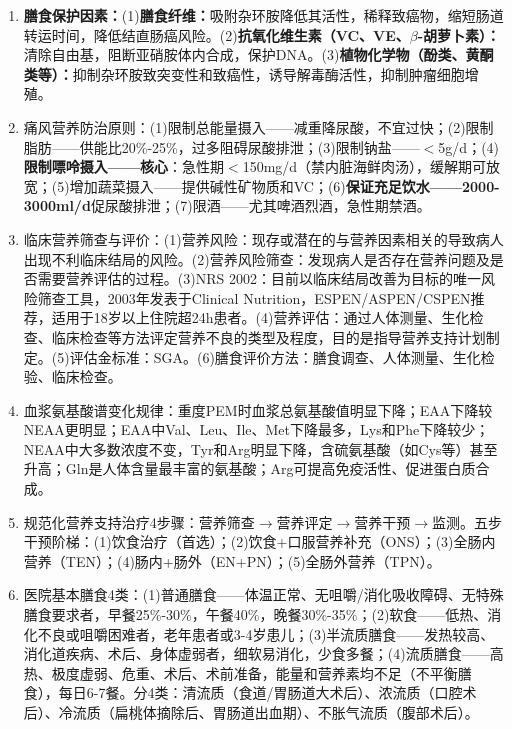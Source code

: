 {\begin{enumerate}[leftmargin=*, itemsep=5pt]
    \item \textbf{膳食保护因素：}(1)\textbf{膳食纤维：}吸附杂环胺降低其活性，稀释致癌物，缩短肠道转运时间，降低结直肠癌风险。(2)\textbf{抗氧化维生素（VC、VE、$\beta$-胡萝卜素）：}清除自由基，阻断亚硝胺体内合成，保护DNA。(3)\textbf{植物化学物（酚类、黄酮类等）：}抑制杂环胺致突变性和致癌性，诱导解毒酶活性，抑制肿瘤细胞增殖。

    \item 痛风营养防治原则：(1)限制总能量摄入——减重降尿酸，不宜过快；(2)限制脂肪——供能比20\%-25\%，过多阻碍尿酸排泄；(3)限制钠盐——$<$5g/d；(4)\textbf{限制嘌呤摄入——核心}：急性期$<$150mg/d（禁内脏海鲜肉汤），缓解期可放宽；(5)增加蔬菜摄入——提供碱性矿物质和VC；(6)\textbf{保证充足饮水——2000-3000ml/d}促尿酸排泄；(7)限酒——尤其啤酒烈酒，急性期禁酒。

    \item 临床营养筛查与评价：(1)营养风险：现存或潜在的与营养因素相关的导致病人出现不利临床结局的风险。(2)营养风险筛查：发现病人是否存在营养问题及是否需要营养评估的过程。(3)NRS 2002：目前以临床结局改善为目标的唯一风险筛查工具，2003年发表于Clinical Nutrition，ESPEN/ASPEN/CSPEN推荐，适用于18岁以上住院超24h患者。(4)营养评估：通过人体测量、生化检查、临床检查等方法评定营养不良的类型及程度，目的是指导营养支持计划制定。(5)评估金标准：SGA。(6)膳食评价方法：膳食调查、人体测量、生化检验、临床检查。

    \item 血浆氨基酸谱变化规律：重度PEM时血浆总氨基酸值明显下降；EAA下降较NEAA更明显；EAA中Val、Leu、Ile、Met下降最多，Lys和Phe下降较少；NEAA中大多数浓度不变，Tyr和Arg明显下降，含硫氨基酸（如Cys等）甚至升高；Gln是人体含量最丰富的氨基酸；Arg可提高免疫活性、促进蛋白质合成。

    \item 规范化营养支持治疗4步骤：营养筛查$\rightarrow$营养评定$\rightarrow$营养干预$\rightarrow$监测。五步干预阶梯：(1)饮食治疗（首选）；(2)饮食+口服营养补充（ONS）；(3)全肠内营养（TEN）；(4)肠内+肠外（EN+PN）；(5)全肠外营养（TPN）。

    \item 医院基本膳食4类：(1)普通膳食——体温正常、无咀嚼/消化吸收障碍、无特殊膳食要求者，早餐25\%-30\%，午餐40\%，晚餐30\%-35\%；(2)软食——低热、消化不良或咀嚼困难者，老年患者或3-4岁患儿；(3)半流质膳食——发热较高、消化道疾病、术后、身体虚弱者，细软易消化，少食多餐；(4)流质膳食——高热、极度虚弱、危重、术后、术前准备，能量和营养素均不足（不平衡膳食），每日6-7餐。分4类：清流质（食道/胃肠道大术后）、浓流质（口腔术后）、冷流质（扁桃体摘除后、胃肠道出血期）、不胀气流质（腹部术后）。


\end{enumerate}}
